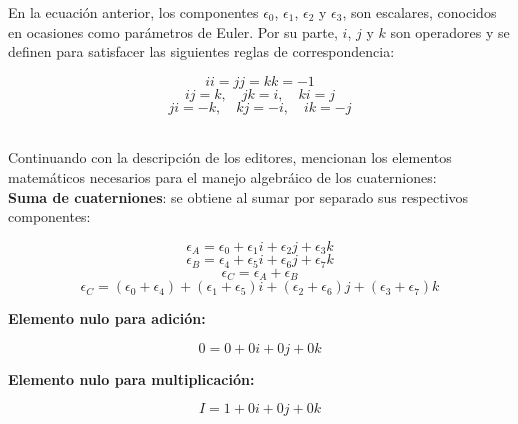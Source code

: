 En la ecuación anterior, los componentes $\epsilon_{0}$, $\epsilon_{1}$, $\epsilon_{2}$ y $\epsilon_{3}$, son escalares, conocidos en ocasiones como parámetros de Euler.
\newpage
Por su parte, $i$, $j$ y $k$ son operadores y se definen para satisfacer las siguientes reglas de correspondencia:

\begin{equation*}
    ii=jj=kk=-1
\end{equation*}
\begin{equation*}
    ij=k,\quad jk=i, \quad ki=j
\end{equation*}
\begin{equation}
    ji=-k, \quad kj = -i, \quad ik = -j
    \label{eqn:ijk}
\end{equation}

\phantom{holis}\\
Continuando con la descripción de los editores, mencionan los elementos matemáticos necesarios para el manejo algebráico de los cuaterniones:\\

\textbf{Suma de cuaterniones}: se obtiene al sumar por separado sus respectivos componentes:

\begin{equation*}
    \epsilon_{A} = \epsilon_{0}+\epsilon_{1}i+
    \epsilon_{2}j+
    \epsilon_{3}k
\end{equation*}
\begin{equation*}
    \epsilon_{B} = \epsilon_{4}+\epsilon_{5}i+
    \epsilon_{6}j+
    \epsilon_{7}k
\end{equation*}
\begin{equation*}
    \epsilon_{C} = \epsilon_{A} + \epsilon_{B}
\end{equation*}
\begin{equation}
\epsilon_{C} =                     (\epsilon_{0}+
    \epsilon_{4})+(\epsilon_{1}+\epsilon_{5})i+
    (\epsilon_{2}+\epsilon_{6})j+
    (\epsilon_{3}+\epsilon_{7})k
    \label{eqn:quat_suma}
\end{equation}

\textbf{Elemento nulo para adición:}

\begin{equation}
    0 = 0 + 0i + 0j + 0k
    \label{eqn:quat_suma_null_element}
\end{equation}

\textbf{Elemento nulo para multiplicación:}

\begin{equation}
    I = 1 + 0i + 0j + 0k
    \label{eqn:quat_mult_null_element}
\end{equation}

